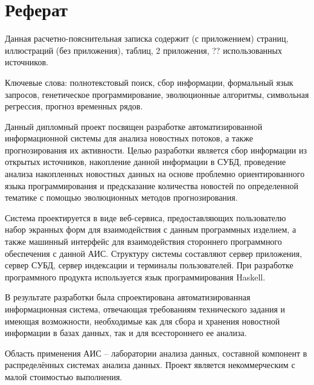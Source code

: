 \section*{Реферат}

Данная расчетно-пояснительная записка содержит \pageref{LastPage} (с приложением) страниц,  иллюстраций (без приложения),  таблиц, 2 приложения, ?? использованных источников.

Ключевые слова: полнотекстовый поиск, сбор информации, формальный язык запросов, генетическое программирование, эволюционные алгоритмы, символьная регрессия, прогноз временных рядов.

Данный дипломный проект посвящен разработке автоматизированной информационной системы для анализа новостных потоков, а также прогнозирования их активности. Целью разработки является сбор информации из открытых источников, накопление данной информации в СУБД, проведение анализа накопленных новостных данных на основе проблемно ориентированного языка программирования и предсказание количества новостей по определенной тематике с помощью эволюционных методов прогнозирования.

Система проектируется в виде веб-сервиса, предоставляющих пользователю набор экранных форм для взаимодействия с данным программных изделием, а также машинный интерфейс для взаимодействия стороннего программного обеспечения с данной АИС. Структуру системы составляют сервер приложения, сервер СУБД, сервер индексации и терминалы пользователей. При разработке программного продукта используется язык программирования Haskell.

В результате разработки была спроектирована автоматизированная информационная система, отвечающая требованиям технического задания и имеющая возможности, необходимые как для сбора и хранения новостной информации в базах данных, так и для всестороннего ее анализа.

Область применения АИС -- лаборатории анализа данных, составной компонент в распределённых системах анализа данных. Проект является некоммерческим с малой стоимостью выполнения.